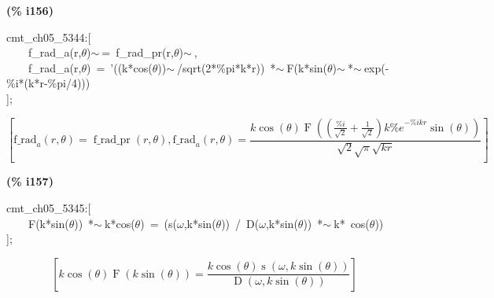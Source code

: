 \documentclass[fleqn]{article}
\begin{document}
\noindent
\begin{minipage}[t]{4.000000em}\color{red}\bfseries
(\% i156)	
\end{minipage}
\begin{minipage}[t]{\textwidth}\color{blue}
cmt\_ch05\_5344:[\\
\ \ \ \ f\_rad\_a(r,\ensuremath{\theta})\ensuremath{\sim\ }=\ f\_rad\_pr(r,\ensuremath{\theta})\ensuremath{\sim\ },\ \\
\ \ \ \ f\_rad\_a(r,\ensuremath{\theta})\ =\ '((k*cos(\ensuremath{\theta}))\ensuremath{\sim\ }/sqrt(2*\%pi*k*r))\ *\ensuremath{\sim\ }F(k*sin(\ensuremath{\theta})\ensuremath{\sim\ }*\ensuremath{\sim\ }exp(-\%i*(k*r-\%pi/4)))\\
];
\end{minipage}
\[\displaystyle \tag{\% o156} 
\left[ {{\ensuremath{\mathrm{f\_ rad}}}_a}\left( r\operatorname{,}\theta \right) =\operatorname{f\_ rad\_ pr}\left( r\operatorname{,}\theta \right) \operatorname{,}{{\ensuremath{\mathrm{f\_ rad}}}_a}\left( r\operatorname{,}\theta \right) =\frac{k \cos{\left( \theta \right) } \operatorname{F}\left( \left( \frac{\% i}{\sqrt{2}}+\frac{1}{\sqrt{2}}\right)  k {{\% e}^{-\% i k r}} \sin{\left( \theta \right) }\right) }{\sqrt{2} \sqrt{\ensuremath{\pi} } \sqrt{k r}}\right] \mbox{}
\]


\noindent
\begin{minipage}[t]{4.000000em}\color{red}\bfseries
(\% i157)	
\end{minipage}
\begin{minipage}[t]{\textwidth}\color{blue}
cmt\_ch05\_5345:[\\
\ \ \ \ F(k*sin(\ensuremath{\theta}))\ *\ensuremath{\sim\ }k*cos(\ensuremath{\theta})\ =\ (s(\ensuremath{\omega},k*sin(\ensuremath{\theta}))\ /\ D(\ensuremath{\omega},k*sin(\ensuremath{\theta}))\ *\ensuremath{\sim\ }k*\ cos(\ensuremath{\theta}))\\
];
\end{minipage}
\[\displaystyle \tag{\% o157} 
\left[ k \cos{\left( \theta \right) } \operatorname{F}\left( k \sin{\left( \theta \right) }\right) =\frac{k \cos{\left( \theta \right) } \operatorname{s}\left( \omega \operatorname{,}k \sin{\left( \theta \right) }\right) }{\operatorname{D}\left( \omega \operatorname{,}k \sin{\left( \theta \right) }\right) }\right] \mbox{}
\]
\end{document}
